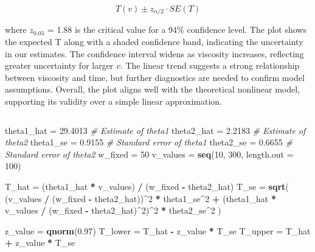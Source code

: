 \documentclass[
  11pt,
]{article}
\newenvironment{Shaded}{\begin{snugshade}}{\end{snugshade}}
\newcommand{\AttributeTok}[1]{\textcolor[rgb]{0.13,0.29,0.53}{#1}}
\newcommand{\CommentTok}[1]{\textcolor[rgb]{0.56,0.35,0.01}{\textit{#1}}}
\newcommand{\DecValTok}[1]{\textcolor[rgb]{0.00,0.00,0.81}{#1}}
\newcommand{\FloatTok}[1]{\textcolor[rgb]{0.00,0.00,0.81}{#1}}
\newcommand{\FunctionTok}[1]{\textcolor[rgb]{0.13,0.29,0.53}{\textbf{#1}}}
\newcommand{\NormalTok}[1]{#1}
\newcommand{\OtherTok}[1]{\textcolor[rgb]{0.56,0.35,0.01}{#1}}
\newcommand{\SpecialCharTok}[1]{\textcolor[rgb]{0.81,0.36,0.00}{\textbf{#1}}}
\begin{document}
\[T(v) \pm z_{\alpha/2} \cdot SE(T)\]

where \(z_{0.03}\) = 1.88 is the critical value for a 94\% confidence
level. The plot shows the expected T along with a shaded confidence
band, indicating the uncertainty in our estimates. The confidence
interval widens as viscosity increases, reflecting greater uncertainty
for larger \(v\). The linear trend suggests a strong relationship
between viscosity and time, but further diagnostics are needed to
confirm model assumptions. Overall, the plot aligns well with the
theoretical nonlinear model, supporting its validity over a simple
linear approximation.

\begin{verbatim}
\end{verbatim}

\begin{Shaded}
\begin{Highlighting}[]
\NormalTok{theta1\_hat }\OtherTok{=} \FloatTok{29.4013}  \CommentTok{\# Estimate of theta1}
\NormalTok{theta2\_hat }\OtherTok{=} \FloatTok{2.2183}   \CommentTok{\# Estimate of theta2}
\NormalTok{theta1\_se }\OtherTok{=} \FloatTok{0.9155}    \CommentTok{\# Standard error of theta1}
\NormalTok{theta2\_se }\OtherTok{=} \FloatTok{0.6655}    \CommentTok{\# Standard error of theta2}
\NormalTok{w\_fixed }\OtherTok{=} \DecValTok{50}
\NormalTok{v\_values }\OtherTok{=} \FunctionTok{seq}\NormalTok{(}\DecValTok{10}\NormalTok{, }\DecValTok{300}\NormalTok{, }\AttributeTok{length.out =} \DecValTok{100}\NormalTok{)}

\NormalTok{T\_hat }\OtherTok{=}\NormalTok{ (theta1\_hat }\SpecialCharTok{*}\NormalTok{ v\_values) }\SpecialCharTok{/}\NormalTok{ (w\_fixed }\SpecialCharTok{{-}}\NormalTok{ theta2\_hat)}
\NormalTok{T\_se }\OtherTok{=} \FunctionTok{sqrt}\NormalTok{(}
\NormalTok{  (v\_values }\SpecialCharTok{/}\NormalTok{ (w\_fixed }\SpecialCharTok{{-}}\NormalTok{ theta2\_hat))}\SpecialCharTok{\^{}}\DecValTok{2} \SpecialCharTok{*}\NormalTok{ theta1\_se}\SpecialCharTok{\^{}}\DecValTok{2} \SpecialCharTok{+}
\NormalTok{  (theta1\_hat }\SpecialCharTok{*}\NormalTok{ v\_values }\SpecialCharTok{/}\NormalTok{ (w\_fixed }\SpecialCharTok{{-}}\NormalTok{ theta2\_hat)}\SpecialCharTok{\^{}}\DecValTok{2}\NormalTok{)}\SpecialCharTok{\^{}}\DecValTok{2} \SpecialCharTok{*}\NormalTok{ theta2\_se}\SpecialCharTok{\^{}}\DecValTok{2}
\NormalTok{)}

\NormalTok{z\_value }\OtherTok{=} \FunctionTok{qnorm}\NormalTok{(}\FloatTok{0.97}\NormalTok{)}
\NormalTok{T\_lower }\OtherTok{=}\NormalTok{ T\_hat }\SpecialCharTok{{-}}\NormalTok{ z\_value }\SpecialCharTok{*}\NormalTok{ T\_se}
\NormalTok{T\_upper }\OtherTok{=}\NormalTok{ T\_hat }\SpecialCharTok{+}\NormalTok{ z\_value }\SpecialCharTok{*}\NormalTok{ T\_se}
\end{Highlighting}
\end{Shaded}
\end{document}
